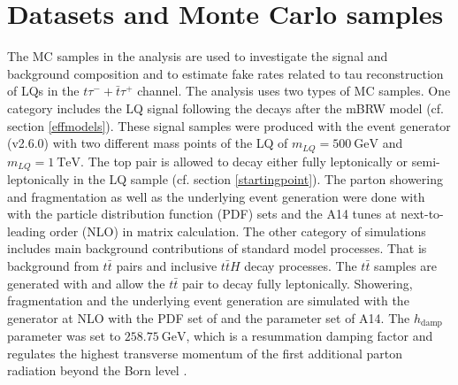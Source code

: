 \section{Datasets and Monte Carlo samples}\label{MCsamples}
The MC samples in the analysis are used to investigate the signal and background composition and to estimate fake rates related to tau reconstruction of LQs in the $t\tau^{-}+\bar{t}\tau^{+}$ channel. The analysis uses two types of MC samples. One category includes the LQ signal following the decays after the mBRW model (cf. section \ref{effmodels}). These signal samples were produced with the event generator {\aMCNLO} (v2.6.0) \cite{aMCNlo} with two different mass points of the LQ of $m_{LQ}=\SI{500}{\giga\electronvolt}$ and $m_{LQ}=\SI{1}{\tera\electronvolt}$. The top pair is allowed to decay either fully leptonically or semi-leptonically in the LQ sample (cf. section \ref{startingpoint}). The parton showering and fragmentation as well as the underlying event generation were done with {\Pythia} \cite{Pythia8} with the particle distribution function (PDF) sets {\NNPDFd} \cite{NNPDF} and the A14 \cite{A14} tunes at next-to-leading order (NLO) in matrix calculation. \newline         
The other category of simulations includes main background contributions of standard model processes. That is background from $t\bar{t}$ pairs and inclusive $t\bar{t}H$ decay processes. The $t\bar{t}$ samples are generated with {\POWHEG} \cite{Powheg} and allow the $t\bar{t}$ pair to decay fully leptonically. Showering, fragmentation and the underlying event generation are simulated with the generator {\Pythia} at NLO with the PDF set of {\NNPDFz} and the parameter set of A14. The $h_\text{damp}$ parameter was set to $\SI{258.75}{\giga\electronvolt}$, which is a resummation damping factor and regulates the highest transverse momentum of the first additional parton radiation beyond the Born level \cite{hdamp}\cite{hdamp2}.\newline
%
